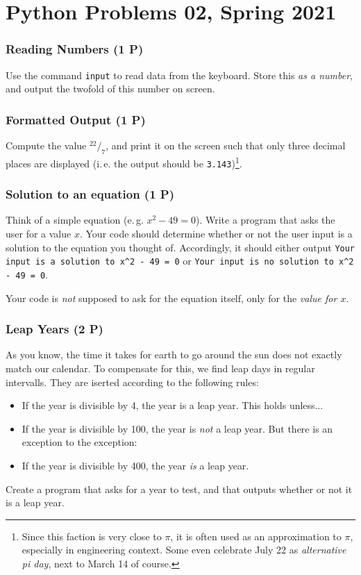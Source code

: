 \documentclass[
	english,
	fontsize=10pt,
	parskip=half,
	titlepage=true,
	DIV=12
]{scrartcl}
\newcommand*{\inPy}[1]{\texttt{#1}}
\newcommand*{\ie}{i.\,e. }
\newcommand*{\eg}{e.\,g. }
\begin{document}
\part*{Python Problems 02, Spring 2021}

\section{Reading Numbers (1 P)}
Use the command \inPy{input} to read data from the keyboard. Store this \emph{as a number}, and output the twofold of this number on screen.

\section{Formatted Output (1 P)}
Compute the value $^{22}/_{7}$, and print it on the screen such that only three decimal places are displayed (\ie the output should be \texttt{3.143})\footnote{Since this faction is very close to $\pi$, it is often used as an approximation to $\pi$, especially in engineering context. Some even celebrate July 22 as \emph{alternative pi day}, next to March 14 of course.}.

\section{Solution to an equation (1 P)}
Think of a simple equation (\eg $x^2 - 49 = 0$). 
Write a program that asks the user for a value $x$. Your code should determine whether or not the user input is a solution to the equation you thought of. Accordingly, it should either output \texttt{Your input is a solution to x\textasciicircum 2 - 49 = 0} or \texttt{Your input is no solution to x\textasciicircum 2 - 49 = 0}.

Your code is \emph{not} supposed to ask for the equation itself, only for the \emph{value for $x$}.

\section{Leap Years (2 P)}
As you know, the time it takes for earth to go around the sun does not exactly match our calendar. To compensate for this, we find leap days in regular intervalls. They are iserted according to the following rules:

\begin{itemize}
  \item If the year is divisible by 4, the year is a leap year. This holds unless...
  \item If the year is divisible by 100, the year is \emph{not} a leap year. But there is an exception to the exception:
  \item If the year is divisible by 400, the year \emph{is} a leap year.
\end{itemize}
Create a program that asks for a year to test, and that outputs whether or not it is a leap year.
\end{document}
